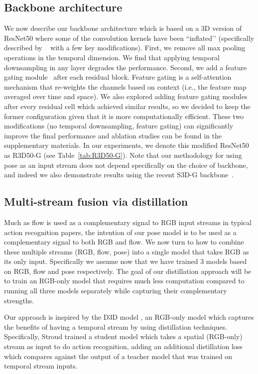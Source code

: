 \documentclass[10pt,twocolumn,letterpaper]{article}
\begin{document}
\subsection{Backbone architecture}
We now describe our backbone architecture which is based on a 3D version of ResNet50 where some of the convolution kernels have been ``inflated’’ (specifically described by ~\cite{wang2018non} with a few key modifications). First, we remove all max pooling operations in the temporal dimension. We find that applying temporal downsampling in any layer degrades the performance. Second, we add a feature gating module~\cite{xie2018rethinking} after each residual block. Feature gating is a self-attention mechanism that re-weights the channels based on  context (i.e., the feature map averaged over time and space). We also explored adding feature gating modules after every residual cell which achieved similar results, so we decided to keep the former configuration given that it is more computationally efficient. These two modifications (no temporal downsampling, feature gating) can significantly improve the final performance and  ablation studies can be found in the supplementary materials. In our experiments, we denote this modified ResNet50 as R3D50-G (see Table~\ref{tab:R3D50-G}).  Note that our methodology for using pose as an input stream does not depend specifically on the choice of backbone,
and indeed we also demonstrate results using the recent S3D-G 
backbone~\cite{xie2018rethinking}.

\subsection{Multi-stream fusion via distillation}
\label{section:multi-distillation}


Much as flow is used as a complementary signal to RGB input streams in typical action recognition papers, the intention of our pose model is to be used as a complementary signal to both RGB and flow. We now turn to how to combine these multiple streams (RGB, flow, pose) into a single model that takes RGB as its only input.   Specifically we assume now that we have trained 3 models based on RGB, flow and pose respectively.  The goal of our distillation approach will be to train an RGB-only model that requires much less computation compared to running all three models separately while capturing their complementary strengths.

Our approach is inspired by the D3D model \cite{stroud2020d3d}, an RGB-only model which captures the benefits of having a temporal stream by using distillation 
techniques.  Specifically, Stroud \etal \cite{stroud2020d3d} trained a student model which takes a spatial (RGB-only) stream as input to do action recognition, adding an additional distillation loss which
compares against the output of a teacher model that was trained on temporal stream inputs.
\end{document}

